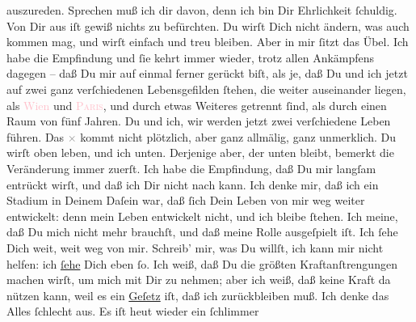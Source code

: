                auszureden. Sprechen muß ich dir davon, denn ich bin Dir Ehrlichkeit ſchuldig. Von
               Dir aus iſt gewiß nichts zu befürchten. Du wirſt {\pb}Dich nicht ändern, was auch kommen mag, und wirſt einfach und treu bleiben. Aber in
               mir ſitzt das Übel. Ich habe die Empfindung und ſie kehrt immer wieder, trotz allen
               Ankämpfens dagegen – daß Du mir auf einmal ferner gerückt biſt, als je, daß Du und
               ich jetzt auf zwei ganz verſchiedenen Lebensgefilden ſtehen, die weiter auseinander
               liegen, als \strikeout{\textcolor{gray}{ho}}{ }\textcolor{pink}{Wien}{}\ledrightnote{\textcolor{pink}{Wien}} und \textsc{\textcolor{pink}{Paris}{}\ledrightnote{\textcolor{pink}{Paris}}}, und  durch etwas Weiteres getrennt ſind, als
               durch einen Raum von fünf Jahren. Du und ich,  wir
               werden jetzt zwei {\pb}verſchiedene Leben führen. Das
                  \textcolor{gray}{×} kommt nicht plötzlich, aber
               ganz  allmälig, ganz unmerklich. Du wirſt oben
               leben, und ich unten. Derjenige aber, der unten bleibt, bemerkt die Veränderung immer
               zuerſt. Ich \strikeout{\textcolor{gray}{l}} habe die Empfindung,
               daß Du  mir langſam entrückt wirſt, und daß ich
               Dir nicht nach kann. Ich denke  mir, daß ich ein
               Stadium in Deinem Daſein war, daß ſich Dein Leben von mir weg weiter entwickelt: denn
               mein Leben  entwickelt {\pb}nicht, und ich bleibe ſtehen. Ich meine, daß Du mich
               nicht mehr brauchſt, und daß meine Rolle \label{K_L02758-8v}\label{K_L02758-8h} ausgeſpielt iſt. Ich ſehe Dich weit, weit weg von mir. Schreib’ mir,
               was Du willſt, ich kann mir nicht helfen: ich \uline{ſehe}
               Dich eben ſo. Ich weiß, daß Du die größten Kraftanſtrengungen machen wirſt, um mich
               mit Dir zu nehmen; aber ich weiß, daß 
               {\pb}keine Kraft da nützen
               kann, weil es ein \uline{Geſetz}
               iſt, daß ich zurückbleiben
               muß.\pend
           \pstart
           Ich denke das Alles
               ſchlecht aus. Es iſt heut
               wieder ein ſchlimmer
